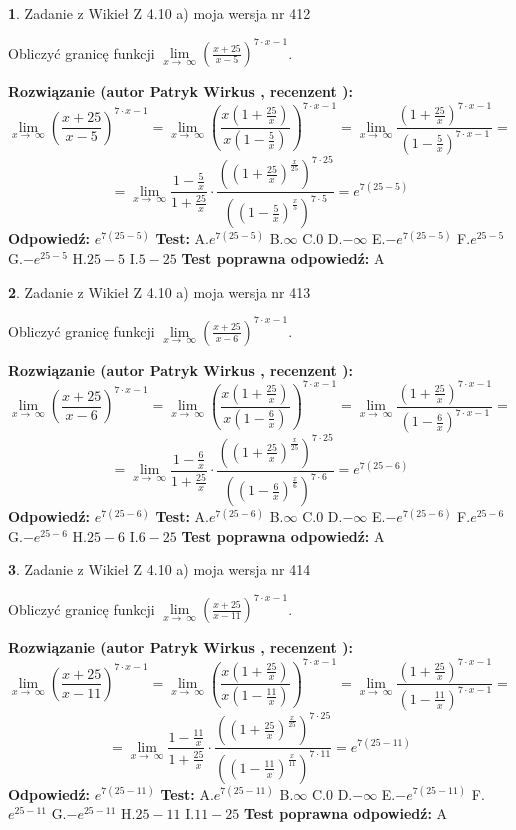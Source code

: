 \documentclass[12pt, a4paper]{article}
\theoremstyle{definition} %
\newtheorem{zad}{}
\newcommand{\zadStart}[1]{\begin{zad}#1\newline}
\newcommand{\zadStop}{\end{zad}}
\newcommand{\rozwStart}[2]{\noindent \textbf{Rozwiązanie (autor #1 , recenzent #2): }\newline}
\newcommand{\rozwStop}{\newline}
\newcommand{\odpStart}{\noindent \textbf{Odpowiedź:}\newline}
\newcommand{\odpStop}{\newline}
\newcommand{\testStart}{\noindent \textbf{Test:}\newline}
\newcommand{\testStop}{\newline}
\newcommand{\kluczStart}{\noindent \textbf{Test poprawna odpowiedź:}\newline}
\newcommand{\kluczStop}{\newline}
\begin{document}
\zadStart{Zadanie z Wikieł Z 4.10 a) moja wersja nr 412}


Obliczyć granicę funkcji  $\lim\limits_{x\to\ \infty}(\frac{x+25}{x-5})^{7\cdot x-1}$.
\zadStop
\rozwStart{Patryk Wirkus}{}
$$\lim\limits_{x\to\ \infty}(\frac{x+25}{x-5})^{7\cdot x-1} = \lim\limits_{x\to\ \infty}(\frac{x(1+\frac{25}{x})}{x(1-\frac{5}{x})})^{7\cdot x-1}=\lim\limits_{x\to\ \infty}\frac{(1+\frac{25}{x})^{7\cdot x-1}}{(1-\frac{5}{x})^{7\cdot x-1}}=$$
$$=\lim\limits_{x\to\ \infty}\frac{1-\frac{5}{x}}{1+\frac{25}{x}}\cdot\frac{((1+\frac{25}{x})^{\frac{x}{25}})^{7\cdot25}}{((1-\frac{5}{x})^{\frac{x}{5}})^{7\cdot5}}=e^{7(25-5)}$$
\rozwStop
\odpStart
$e^{7(25-5)}$
\odpStop
\testStart
A.$e^{7(25-5)}$ B.$\infty$ C.$0$ D.$-\infty$ E.$-e^{7(25-5)}$
F.$e^{25-5}$ G.$-e^{25-5}$
H.$25-5$
I.$5-25$
\testStop
\kluczStart
A
\kluczStop



\zadStart{Zadanie z Wikieł Z 4.10 a) moja wersja nr 413}


Obliczyć granicę funkcji  $\lim\limits_{x\to\ \infty}(\frac{x+25}{x-6})^{7\cdot x-1}$.
\zadStop
\rozwStart{Patryk Wirkus}{}
$$\lim\limits_{x\to\ \infty}(\frac{x+25}{x-6})^{7\cdot x-1} = \lim\limits_{x\to\ \infty}(\frac{x(1+\frac{25}{x})}{x(1-\frac{6}{x})})^{7\cdot x-1}=\lim\limits_{x\to\ \infty}\frac{(1+\frac{25}{x})^{7\cdot x-1}}{(1-\frac{6}{x})^{7\cdot x-1}}=$$
$$=\lim\limits_{x\to\ \infty}\frac{1-\frac{6}{x}}{1+\frac{25}{x}}\cdot\frac{((1+\frac{25}{x})^{\frac{x}{25}})^{7\cdot25}}{((1-\frac{6}{x})^{\frac{x}{6}})^{7\cdot6}}=e^{7(25-6)}$$
\rozwStop
\odpStart
$e^{7(25-6)}$
\odpStop
\testStart
A.$e^{7(25-6)}$ B.$\infty$ C.$0$ D.$-\infty$ E.$-e^{7(25-6)}$
F.$e^{25-6}$ G.$-e^{25-6}$
H.$25-6$
I.$6-25$
\testStop
\kluczStart
A
\kluczStop



\zadStart{Zadanie z Wikieł Z 4.10 a) moja wersja nr 414}


Obliczyć granicę funkcji  $\lim\limits_{x\to\ \infty}(\frac{x+25}{x-11})^{7\cdot x-1}$.
\zadStop
\rozwStart{Patryk Wirkus}{}
$$\lim\limits_{x\to\ \infty}(\frac{x+25}{x-11})^{7\cdot x-1} = \lim\limits_{x\to\ \infty}(\frac{x(1+\frac{25}{x})}{x(1-\frac{11}{x})})^{7\cdot x-1}=\lim\limits_{x\to\ \infty}\frac{(1+\frac{25}{x})^{7\cdot x-1}}{(1-\frac{11}{x})^{7\cdot x-1}}=$$
$$=\lim\limits_{x\to\ \infty}\frac{1-\frac{11}{x}}{1+\frac{25}{x}}\cdot\frac{((1+\frac{25}{x})^{\frac{x}{25}})^{7\cdot25}}{((1-\frac{11}{x})^{\frac{x}{11}})^{7\cdot11}}=e^{7(25-11)}$$
\rozwStop
\odpStart
$e^{7(25-11)}$
\odpStop
\testStart
A.$e^{7(25-11)}$ B.$\infty$ C.$0$ D.$-\infty$ E.$-e^{7(25-11)}$
F.$e^{25-11}$ G.$-e^{25-11}$
H.$25-11$
I.$11-25$
\testStop
\kluczStart
A
\kluczStop
\end{document}
